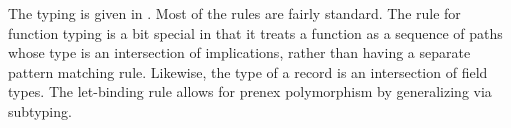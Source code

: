 \documentclass[acmsmall]{acmart}
\theoremstyle{definition}
\newtheorem{definition}{Definition}[section]
\begin{document}











The typing is given in .
Most of the rules are fairly standard. 
The rule for function typing is a bit special in that
it treats a function as a sequence of paths whose type is an intersection of implications,
rather than having a separate pattern matching rule. 
Likewise, the type of a record is an intersection of field types.
The let-binding rule allows for prenex polymorphism by generalizing via subtyping. 
\end{document}

